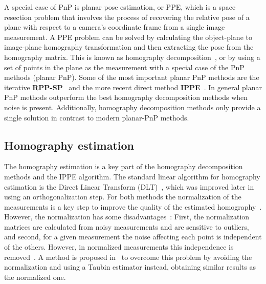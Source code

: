 \documentclass[letterpaper, 10 pt, conference]{ieeeconf}  %
\begin{document}
	A special case of PnP is planar pose estimation, or PPE, which is a space resection problem that involves the process of recovering the relative pose of a plane with respect to a camera's coordinate frame from a single image measurement. A PPE problem can be solved by calculating the object-plane to image-plane homography transformation and then extracting the pose from the homography matrix. This is known as homography decomposition~\cite{Sturm2000, Zhang2000}, or by using a set of points in the plane as the measurement with a special case of the PnP methods (planar PnP). Some of the most important planar PnP methods are the iterative \textbf{RPP-SP}~\cite{Schweighofer2006} and the more recent direct method \textbf{IPPE}~\cite{Collins2014}. In general planar PnP methods outperform the best homography decomposition methods when noise is present. Additionally, homography decomposition methods only provide a single solution in contrast to modern planar-PnP methods.
	
	\subsection{Homography estimation}
	The homography estimation is a key part of the homography decomposition methods and the IPPE algorithm. The standard linear algorithm for homography estimation is the Direct Linear Transform (DLT)~\cite{RichardHartley2003}, which was improved later in~\cite{Harker2005} using an orthogonalization step. For both methods the normalization of the measurements is a key step to improve the quality of the estimated homography~\cite{RichardHartley2003}. However, the normalization has some disadvantages~\cite{Rangarajan2009}: First, the normalization matrices are calculated from noisy measurements and are sensitive to outliers, and second, for a given measurement the noise affecting each point is independent of the others. However, in normalized measurements this independence is removed~\cite{Chen2009}. A method is proposed in~\cite{Rangarajan2009} to overcome this problem by avoiding the normalization and using a Taubin estimator instead, obtaining similar results as the normalized one.
	
	
	
\end{document}
